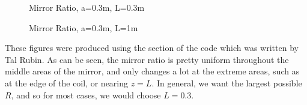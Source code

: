 \documentclass[12pt]{article}
\begin{document}
\begin{figure}[h!]
  \caption{\label{fig:R0.3} Mirror Ratio, a=0.3m, L=0.3m}
\end{figure}
\begin{figure}[h!]
  \caption{\label{fig:R1} Mirror Ratio, a=0.3m, L=1m}
\end{figure}

These figures were produced using the section of the code which was written by Tal Rubin. As can be seen, the mirror ratio is pretty uniform throughout the middle areas of the mirror, and only changes a lot at the extreme areas, such as at the edge of the coil, or nearing $z=L$. In general, we want the largest possible $R$, and so for most cases, we would choose $L=0.3$. 
\end{document}
